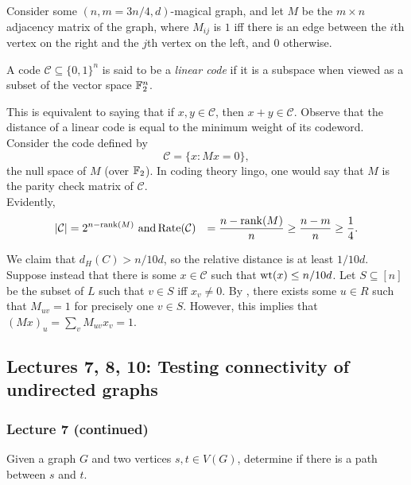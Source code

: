 			Consider some $(n,m=3n/4,d)$-magical graph, and let $M$ be the $m\times n$ adjacency matrix of the graph, where $M_{ij}$ is $1$ iff there is an edge between the $i$th vertex on the right and the $j$th vertex on the left, and $0$ otherwise.\\

			\begin{fdef}
				A code $\mathcal{C} \subseteq \{0,1\}^n$ is said to be a \emph{linear code} if it is a subspace when viewed as a subset of the vector space $\mathbb{F}_2^n$.
			\end{fdef}
			This is equivalent to saying that if $x,y \in \mathcal{C}$, then $x+y \in \mathcal{C}$. Observe that the distance of a linear code is equal to the minimum weight of its codeword. \\

			Consider the code defined by
			\[ \mathcal{C} = \{ x : Mx = 0 \}, \]
			the null space of $M$ (over $\mathbb{F}_2$). In coding theory lingo, one would say that $M$ is the parity check matrix of $\mathcal{C}$.\\
			Evidently,
			\begin{align*}
				|\mathcal{C}| &= 2^{n - \operatorname{rank}(M)} \text{ and}
				\operatorname{Rate}(\mathcal{C}) &= \frac{n-\operatorname{rank}(M)}{n} \ge \frac{n-m}{n} \ge \frac{1}{4}.
			\end{align*}

			We claim that $d_H(C) > n/10d$, so the relative distance is at least $1/10d$. Suppose instead that there is some $x \in \mathcal{C}$ such that $\operatorname{wt}(x) \le n/10d$. Let $S \subseteq [n]$ be the subset of $L$ such that $v \in S$ iff $x_v \ne 0$. By , there exists some $u \in R$ such that $M_{uv} = 1$ for precisely one $v \in S$. However, this implies that $(Mx)_u = \sum_v M_{uv} x_{v} = 1$.

	\subsection{Lectures 7, 8, 10: Testing connectivity of undirected graphs}

		\subsubsection{Lecture 7 (continued)}

			\begin{problem*}
				Given a graph $G$ and two vertices $s,t \in V(G)$, determine if there is a path between $s$ and $t$.
			\end{problem*}

